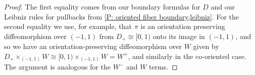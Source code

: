 \begin{proof}
The first equality comes from our boundary formulas for $D$ and our Leibniz rules for pullbacks from \cref{P: oriented fiber boundary,leibniz}.
For the second equality we use, for example, that $\pi$ is an orientation preserving diffeomorphism over $(-1,1)$ from $D_+ \cong [0,1)$ onto its image in $(-1,1)$, and so we have an orientation-preserving diffeomorphism over $W$ given by $D_+\times_{(-1,1)} W \cong [0,1)\times_{(-1,1)} W = W^+$, and similarly in the co-oriented case.
The argument is analogous for the $W^-$ and $W$ terms.
\end{proof}

\begin{comment}
	Next let us see how to use creasing in the context of chains and cochains.

	If $W \in PC_*^{\Gamma}(M)$ represented by $r_W \colon W \to M$, then $\Cre(W)$ is also compact and oriented, and we have a map $r_{\Cre(W)} = r_W\pi_W \colon W \to M$ with $\pi_W$ being the projection of $\Cre(W) = D\times_{(-1,1)}W$ to $W$.
	Thus $r_{\Cre(W)} \colon \Cre(W) \to M$ gives us a new element of $PC_*^\Gamma(M)$.
	If $W \in PC^*_\Gamma(M)$, then to get an element $\Cre(W) \in PC^*_\Gamma(M)$ we will need to assume that $\varphi \colon W \to (-1,1)$ is a composition of maps $W \xr{r_W}M \xr{\phi} (-1,1)$.
	We can then form the space $\Cre(W)$ as the pullback by $\phi r_W$ of $\pi \colon D \to (-1,1)$.
	As $\pi$ is proper and co-oriented, the pullback $\pi^* = \pi_W \colon \Cre(W) \to W$ will be proper and co-oriented by Lemma \ref{L: co-orientable pullback} and Definition \ref{D: pullback coorient}.
	We then let $r_{\Cre(W)} = r_W \pi^*$ to obtain an element of $\Cre(W) \in PC^*_\Gamma(M)$.
	By \cite[Propositions 7.4]{Joy12} and Theorem \ref{leibniz}, our boundary formulas for $\Cre(W)$ continue to hold as elements of $PC_*^{\Gamma}(M)$ or $PC^*_{\Gamma}(M)$.
\end{comment}

\begin{comment}
\begin{convention}\label{C: regular value setup}
	In order to crease an element of $PC_*^\Gamma(M)$ or $PC^*_\Gamma(M)$ represented by $r_W \colon W \to M$, we need a smooth map $\varphi \colon W \to (-1,1)$ so that the composite $\varphi \colon W \xr{r_W}M \xr{\phi} (-1,1)$ has $0$ as a regular value.
	In this case $M^0$ and $M^\pm$ are fiber products and thus manifolds with corners as in \cref{E: manifold decomposition}.
	Also as observed there, in this case $\varphi$ has $0$ as a regular value if and only if $r_W$ is transverse to $M^0$, in which case we also have $W^0 = M^0 \times_M W$ and $W^\pm = M^\pm \times_M W$.
	Unless noted, we will always assume this situation when working with creasing, i.e.\ that we have a fixed $\phi \colon M \to (-1,1)$ with $0$ a regular value and that creasing is defined with respect to the composition $\varphi = \phi r_W$ with $r_W$ transverse to $M^0$.
\end{convention}
\end{comment}

